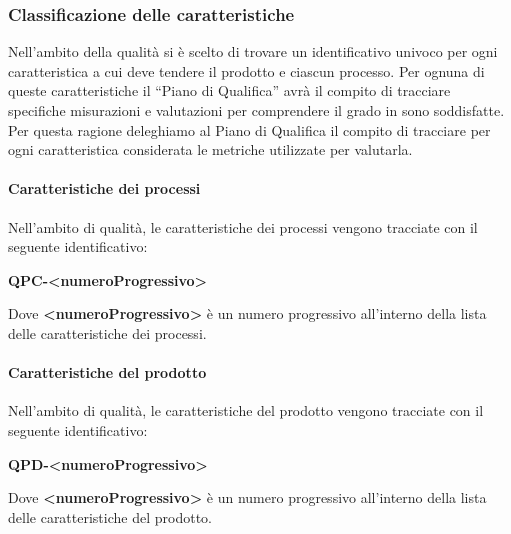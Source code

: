 		\subsubsection{Classificazione delle caratteristiche}
			Nell’ambito della qualità si è scelto di trovare un identificativo univoco per ogni caratteristica a cui deve tendere il prodotto e ciascun processo. Per ognuna di queste caratteristiche il “Piano di Qualifica” avrà il compito di tracciare specifiche misurazioni e valutazioni per comprendere il grado in sono soddisfatte. Per questa ragione deleghiamo al Piano di Qualifica il compito di tracciare per ogni caratteristica considerata le metriche utilizzate per valutarla. 
			\paragraph{Caratteristiche dei processi}
				Nell'ambito di qualità, le caratteristiche dei processi vengono tracciate con il seguente identificativo:
				\begin{center}
					\textbf{QPC-<numeroProgressivo>}
				\end{center}
				Dove \textbf{<numeroProgressivo>} è un numero progressivo all’interno della lista delle caratteristiche dei processi.
			\paragraph{Caratteristiche del prodotto}
				Nell'ambito di qualità, le caratteristiche del prodotto vengono tracciate con il seguente identificativo:
				\begin{center}
					\textbf{QPD-<numeroProgressivo>}
				\end{center}
				Dove \textbf{<numeroProgressivo>} è un numero progressivo all’interno della lista delle caratteristiche del prodotto.
			
